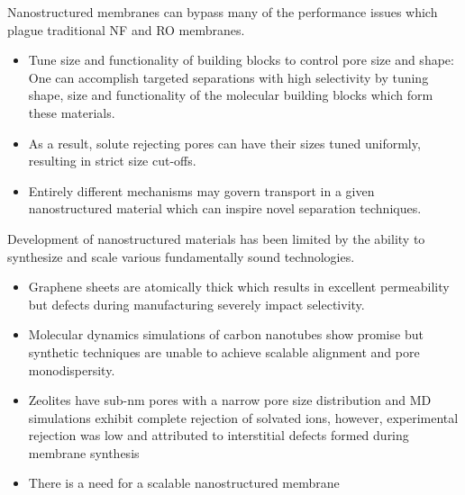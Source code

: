 \documentclass{article}
\begin{document}
  Nanostructured membranes can bypass many of the performance issues which
  plague traditional NF and RO membranes.
  \begin{itemize}
    \item Tune size and functionality of building blocks to control pore
    size and shape: One can accomplish targeted separations with high 
    selectivity by tuning shape, size and functionality of the molecular
    building blocks which form these materials. %
    \item As a result, solute rejecting pores can have their sizes tuned
    uniformly, resulting in strict size cut-offs.
    \item Entirely different mechanisms may govern transport in a given
    nanostructured material which can inspire novel separation techniques.
  \end{itemize}
  
  Development of nanostructured materials has been limited by the ability
  to synthesize and scale various fundamentally sound technologies.
  \begin{itemize}
    \item Graphene sheets are atomically thick which results in excellent
    permeability but defects during manufacturing severely impact 
    selectivity. \cite{cohen-tanugi_multilayer_2016}
    \item Molecular dynamics simulations of carbon nanotubes show
    promise \cite{humplik_nanostructured_2011} but synthetic techniques are 
    unable to achieve scalable alignment and pore monodispersity.\cite{hata_water-assisted_2004,maruyama_growth_2005}
    \item Zeolites have sub-nm pores with a narrow pore size 
    distribution and MD simulations exhibit complete rejection of solvated ions, \cite{murad_molecular_1998}
    however, experimental rejection was low and attributed to interstitial
    defects formed during membrane synthesis \cite{li_desalination_2004}
    \item There is a need for a scalable nanostructured membrane
  \end{itemize}
  
\end{document}
